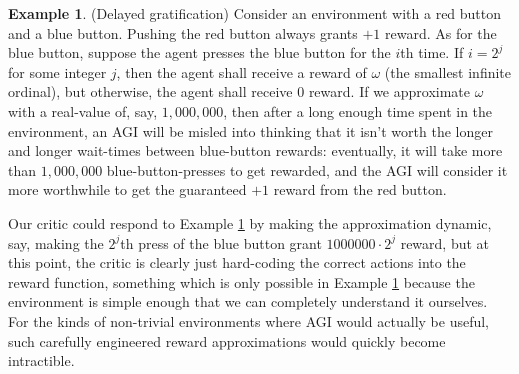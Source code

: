 \documentclass[reqno]{article}
\theoremstyle{definition}
\newtheorem{example}[theorem]{Example}
\begin{document}
\begin{example}
\label{funnyexample}
(Delayed gratification)
Consider an environment with a red button and a blue button.
Pushing the red button always grants $+1$ reward.
As for the blue button, suppose the agent presses the blue button for the
$i$th time. If $i=2^j$ for some integer $j$, then the agent shall receive a
reward of $\omega$ (the smallest infinite ordinal), but otherwise, the agent
shall receive $0$ reward.
If we approximate $\omega$ with a real-value of, say, $1,000,000$,
then after a long enough time spent in the environment, an AGI will be misled into
thinking that it isn't worth the longer and longer wait-times between blue-button
rewards: eventually, it will take more than $1,000,000$ blue-button-presses to get
rewarded, and the AGI will consider it more worthwhile to get the guaranteed $+1$
reward from the red button.
\end{example}

Our critic could respond to Example \ref{funnyexample}
by making the approximation dynamic, say, making the
$2^j$th press of the blue button grant $1000000\cdot 2^j$ reward, but at this point,
the critic is clearly just hard-coding the correct actions into the reward function,
something which is only possible in Example \ref{funnyexample} because the environment
is simple enough that we can completely understand it ourselves. For the
kinds of non-trivial environments where AGI would actually be useful, such carefully
engineered reward approximations would quickly become intractible.

\end{document}
